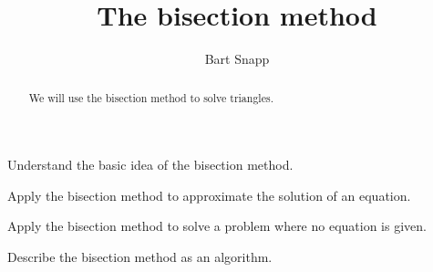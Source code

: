 \documentclass[handout,nooutcomes,noauthor]{ximera}
\title{The bisection method}
\author{Bart Snapp}
\begin{document}
\begin{abstract}
  We will use the bisection method to solve triangles.
\end{abstract}
\maketitle

\begin{listOutcomes}
\item{Understand the basic idea of the bisection method.}
\item{Apply the bisection method to approximate the solution of an equation.}
\item{Apply the bisection method to solve a problem where no equation is given.}
\item{Describe the bisection method as an algorithm.}
\end{listOutcomes}
\mynewpage
\end{document}
